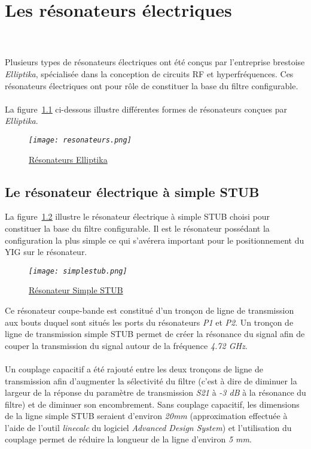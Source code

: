 \documentclass[12pt,fleqn]{book} %
\begin{document}
\setcounter{chapter}{0}
\chapter{Les résonateurs électriques} 
~\\\\\indent Plusieurs types de résonateurs électriques ont été conçus par l'entreprise brestoise \emph{Elliptika}, spécialisée dans la conception de circuits RF et hyperfréquences. Ces résonateurs électriques ont pour rôle de constituer la base du filtre configurable.
~\\\\La figure~\underline{\color{blue}\ref{resonateurs}} ci-dessous illustre différentes formes de résonateurs conçues par \emph{Elliptika}.
\begin{figure}[H]
	\centering
	\itshape
	\texttt{[image: resonateurs.png]}
	\caption{\label{resonateurs} \underline{Résonateurs Elliptika}}
\end{figure}
\section{Le résonateur électrique à simple STUB}
\noindent La figure~\underline{\color{blue}\ref{simplestub}} illustre le résonateur électrique à simple STUB choisi pour constituer la base du filtre configurable. Il est le résonateur possédant la configuration la plus simple ce qui s'avérera important pour le positionnement du YIG sur le résonateur.
\begin{figure}[H]
	\centering
	\itshape
	\texttt{[image: simplestub.png]}
	\caption{\label{simplestub} \underline{Résonateur Simple STUB}}
\end{figure}
\noindent Ce résonateur coupe-bande est constitué d'un tronçon de ligne de transmission aux bouts duquel sont situés les ports du résonateurs \emph{P1} et \emph{P2}. Un tronçon de ligne de transmission simple STUB permet de créer la résonance du signal afin de couper la transmission du signal autour de la fréquence \emph{4.72 GHz}.
~\\\\Un couplage capacitif a été rajouté entre les deux tronçons de ligne de transmission afin d'augmenter la sélectivité du filtre (c'est à dire de diminuer la largeur de la réponse du paramètre de transmission \emph{S21} à \emph{-3 dB} à la résonance du filtre) et de diminuer son encombrement. Sans couplage capacitif, les dimensions de la ligne simple STUB seraient d'environ \emph{20mm} (approximation effectuée à l'aide de l'outil \emph{linecalc} du logiciel \emph{Advanced Design System}) et l'utilisation du couplage permet de réduire la longueur de la ligne d'environ \emph{5 mm}.
\end{document}
